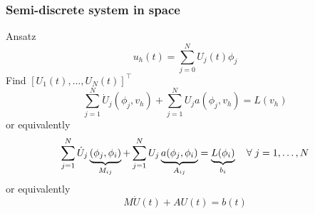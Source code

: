 \begin{frame}
  \frametitle{Semi-discrete system in space}
  Ansatz
  \begin{equation*}
    u_h(t) = \sum_{j=0}^N U_j(t) \phi_j
  \end{equation*}
Find $[U_1(t),\ldots, U_N(t)]^{\top}$
  \begin{equation*}
    \sum_{j=1}^N \dot U_j  (\phi_j,v_h)
    + \sum_{j=1}^N U_j a(\phi_j,v_h)
    = L(v_h)
  \end{equation*}
  or equivalently
  \begin{equation*}
    \sum_{j=1}^N \dot U_j  
    \underbrace{(\phi_j,\phi_i)}_{M_{ij}}
    + \sum_{j=1}^N U_j 
    \underbrace{a(\phi_j,\phi_i)}_{A_{ij}}
    = \underbrace{L(\phi_i)}_{b_i}
    \quad \forall \; j = 1,\ldots,N
  \end{equation*}
  or equivalently
  \begin{equation*}
    M \dot U(t) + AU(t) = b(t)
  \end{equation*}
\end{frame}

